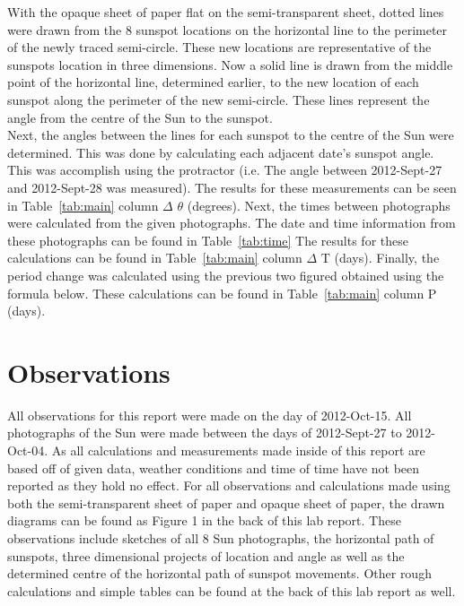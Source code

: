 \documentclass{article}
\begin{document}
With the opaque sheet of paper flat on the semi-transparent sheet, dotted lines were drawn from the 8 sunspot locations
on the horizontal line to the perimeter of the newly traced semi-circle. These new locations are representative of the 
sunspots location in three dimensions. Now a solid line is drawn from the middle point of the horizontal line, determined
earlier, to the new location of each sunspot along the perimeter of the new semi-circle. These lines represent the angle
from the centre of the Sun to the sunspot.\\

Next, the angles between the lines for each sunspot to the centre of the Sun were determined. This was done by calculating
each adjacent date's sunspot angle. This was accomplish using the protractor (i.e. The angle between 2012-Sept-27 and 
2012-Sept-28 was measured). The results for these measurements can be seen in Table~\ref{tab:main} column 
$\Delta$ $\theta$ (degrees). Next, the times between photographs were calculated from the given photographs. The date
and time information from these photographs can be found in Table~\ref{tab:time} The results
for these calculations can be found in Table~\ref{tab:main} column $\Delta$ T (days). Finally, the period change was calculated
using the previous two figured obtained using the formula below. These calculations can be found in Table~\ref{tab:main} column 
P (days).\\


\section{Observations}

All observations for this report were made on the day of 2012-Oct-15. All photographs of the Sun were made between the
days of 2012-Sept-27 to 2012-Oct-04. As all calculations and measurements made inside of this report are based off of
given data, weather conditions and time of time have not been reported as they hold no effect. For all observations and
calculations made using both the semi-transparent sheet of paper and opaque sheet of paper, the drawn diagrams
can be found as Figure 1 in the back of this lab report. These observations include sketches of all 8 Sun photographs, 
the horizontal path of sunspots, three dimensional projects of location and angle as well as the determined centre of
the horizontal path of sunspot movements. Other rough calculations and simple tables can be found at the back
of this lab report as well.
\end{document}
